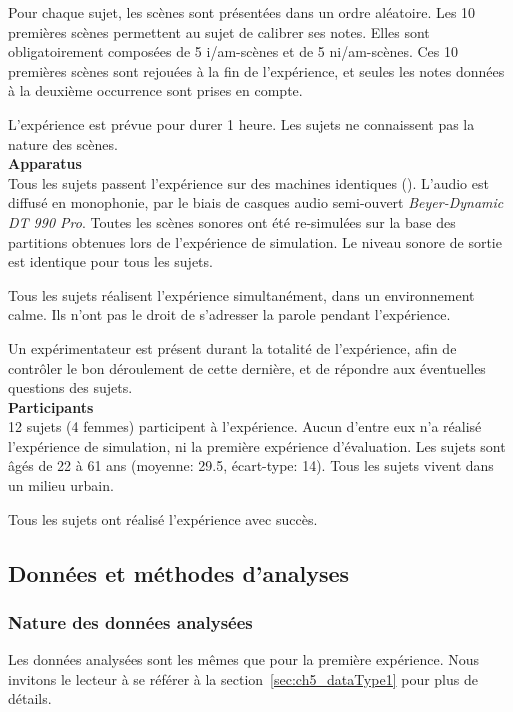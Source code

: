 Pour chaque sujet, les scènes sont présentées dans un ordre aléatoire. Les 10 premières scènes permettent au sujet de calibrer ses notes. Elles sont obligatoirement composées de 5 i/am-scènes et de 5 ni/am-scènes. Ces 10 premières scènes sont rejouées à la fin de l'expérience, et seules les notes données à la deuxième occurrence sont prises en compte. 

L'expérience est prévue pour durer 1 heure. Les sujets ne connaissent pas la nature des scènes.\\

\textbf{Apparatus} \\

Tous les sujets passent l'expérience sur des machines identiques (). L'audio est diffusé en monophonie, par le biais de casques audio semi-ouvert \emph{Beyer-Dynamic DT 990 Pro}. Toutes les scènes sonores ont été re-simulées sur la base des partitions obtenues lors de l'expérience de simulation. Le niveau sonore de sortie est identique pour tous les sujets.

Tous les sujets réalisent l'expérience simultanément, dans un environnement calme. Ils n'ont pas le droit de s'adresser la parole pendant l'expérience. 

Un expérimentateur est présent durant la totalité de l'expérience, afin de contrôler le bon déroulement de cette dernière, et de répondre aux éventuelles questions des sujets.  \\

\textbf{Participants} \\

12 sujets (4 femmes) participent à l'expérience. Aucun d'entre eux n'a réalisé l'expérience de simulation, ni la première expérience d'évaluation. Les sujets sont âgés de 22 à 61 ans (moyenne: 29.5, écart-type: 14). Tous les sujets vivent dans un milieu urbain.

Tous les sujets ont réalisé l'expérience avec succès.

\subsection{Données et méthodes d'analyses}

\subsubsection{Nature des données analysées}

Les données analysées sont les mêmes que pour la première expérience. Nous invitons le lecteur à se référer à la section~\ref{sec:ch5_dataType1} pour plus de détails.
 
